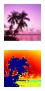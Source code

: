 \begin{figure}
\centering
    \centering
    \begin{subfigure}{0.31\textwidth}
        \includegraphics[width=\textwidth]{figures/RegDream.pdf}
    \end{subfigure}
    \hspace*{\fill}
    \begin{subfigure}{0.31\textwidth}
        \includegraphics[width=\textwidth]{figures/NegDream.pdf}

\end{subfigure}
\end{figure}
